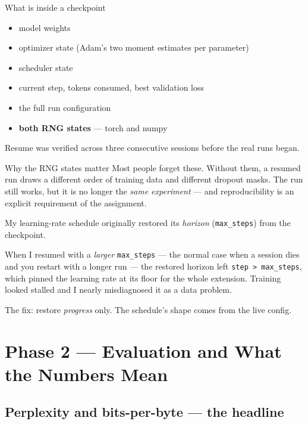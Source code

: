 \documentclass[11pt]{report}
\newcommand{\p}[1]{\texttt{#1}}
\begin{document}
\begin{implementation}{What is inside a checkpoint}
\begin{itemize}
\item model weights
\item optimizer state (Adam's two moment estimates per parameter)
\item scheduler state
\item current step, tokens consumed, best validation loss
\item the full run configuration
\item \textbf{both RNG states} --- torch and numpy
\end{itemize}

Resume was verified across three consecutive sessions before the real runs
began.
\end{implementation}

\begin{concept}{Why the RNG states matter}
Most people forget these. Without them, a resumed run draws a different order of
training data and different dropout masks. The run still works, but it is no
longer the \emph{same experiment} --- and reproducibility is an explicit
requirement of the assignment.
\end{concept}

\begin{warnbox}
My learning-rate schedule originally restored its \emph{horizon}
(\p{max\_steps}) from the checkpoint.

When I resumed with a \emph{larger} \p{max\_steps} --- the normal case when a
session dies and you restart with a longer run --- the restored horizon left
\p{step > max\_steps}, which pinned the learning rate at its floor for the whole
extension. Training looked stalled and I nearly misdiagnosed it as a data
problem.

The fix: restore \emph{progress} only. The schedule's shape comes from the live
config.
\end{warnbox}

\chapter{Phase 2 --- Evaluation and What the Numbers Mean}

\section{Perplexity and bits-per-byte --- the headline}
\end{document}
